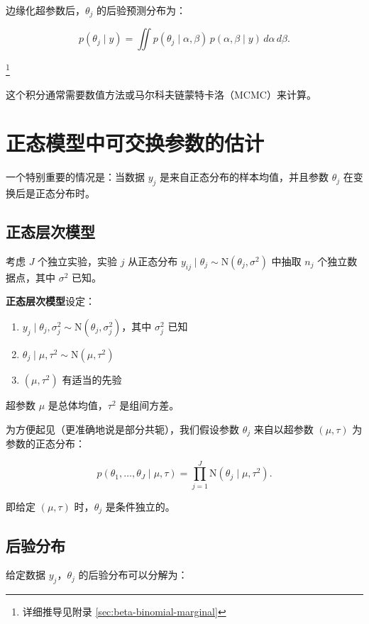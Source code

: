 边缘化超参数后，$\theta_j$ 的后验预测分布为：

\[
p(\theta_j \mid y) = \iint p(\theta_j \mid \alpha, \beta) \, p(\alpha, \beta \mid y) \, d\alpha \, d\beta.
\]
\addtocounter{footnote}{-1}\footnote{详细推导见附录 \cref{sec:beta-binomial-marginal}}

这个积分通常需要数值方法或马尔科夫链蒙特卡洛（MCMC）来计算。

\section{正态模型中可交换参数的估计}\label{sec:normal-hierarchical}

一个特别重要的情况是：当数据 $y_j$ 是来自正态分布的样本均值，并且参数 $\theta_j$ 在变换后是正态分布时。

\subsection{正态层次模型}

考虑 $J$ 个独立实验，实验 $j$ 从正态分布 $y_{ij} \mid \theta_j \sim \mathrm{N}(\theta_j, \sigma^2)$ 中抽取 $n_j$ 个独立数据点，其中 $\sigma^2$ 已知。

\textbf{正态层次模型}设定：

\begin{enumerate}
  \item $y_j \mid \theta_j, \sigma_j^2 \sim \mathrm{N}(\theta_j, \sigma_j^2)$，其中 $\sigma_j^2$ 已知
  \item $\theta_j \mid \mu, \tau^2 \sim \mathrm{N}(\mu, \tau^2)$
  \item $(\mu, \tau^2)$ 有适当的先验
\end{enumerate}

超参数 $\mu$ 是总体均值，$\tau^2$ 是组间方差。

为方便起见（更准确地说是部分共轭），我们假设参数 $\theta_j$ 来自以超参数 $(\mu, \tau)$ 为参数的正态分布：

\[
p(\theta_1, \ldots, \theta_J \mid \mu, \tau) = \prod_{j=1}^{J} \mathrm{N}(\theta_j \mid \mu, \tau^2). \label{eq:normal-hierarchical-prior}
\]

即给定 $(\mu, \tau)$ 时，$\theta_j$ 是条件独立的。

\subsection{后验分布}\label{sec:normal-posterior}

给定数据 $y_j$，$\theta_j$ 的后验分布可以分解为：

